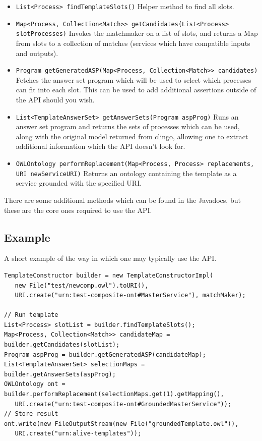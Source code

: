 \documentclass{llncs}
\begin{document}
 \begin{itemize}
 	\item \texttt{List<Process> findTemplateSlots()} Helper method to find all slots.
	\item \texttt{Map<Process, Collection<Match>> getCandidates(List<Process> slotProcesses)} Invokes the matchmaker on a list of slots, and 
 		returns a Map from slots to a collection of matches (services which have compatible inputs and outputs).
	\item \texttt{Program getGeneratedASP(Map<Process, Collection<Match>> candidates)} Fetches the answer set program which will 
 		be used to select which processes can fit into each slot. This can be used to add additional assertions outside of 
 		the API should you wish.
	\item \texttt{List<TemplateAnswerSet> getAnswerSets(Program aspProg)} Runs an answer set program and returns the sets of 
 		processes which can be used, along with the original model returned from clingo, allowing one to extract 
 		additional information which the API doesn't look for.
	\item \texttt{OWLOntology performReplacement(Map<Process, Process> replacements, URI newServiceURI)} Returns an ontology 
 		containing the template as a service grounded with the specified URI.
 \end{itemize}

There are some additional methods which can be found in the Javadocs, but these 
are the core ones required to use the API.

\subsection{Example}

A short example of the way in which one may typically use the API.

\begin{verbatim}
TemplateConstructor builder = new TemplateConstructorImpl(
   new File("test/newcomp.owl").toURI(), 
   URI.create("urn:test-composite-ont#MasterService"), matchMaker);
		
// Run template
List<Process> slotList = builder.findTemplateSlots();
Map<Process, Collection<Match>> candidateMap = builder.getCandidates(slotList);
Program aspProg = builder.getGeneratedASP(candidateMap);
List<TemplateAnswerSet> selectionMaps = builder.getAnswerSets(aspProg);
OWLOntology ont = builder.performReplacement(selectionMaps.get(1).getMapping(),
   URI.create("urn:test-composite-ont#GroundedMasterService"));
// Store result
ont.write(new FileOutputStream(new File("groundedTemplate.owl")), 
   URI.create("urn:alive-templates"));
\end{verbatim}
\end{document}

